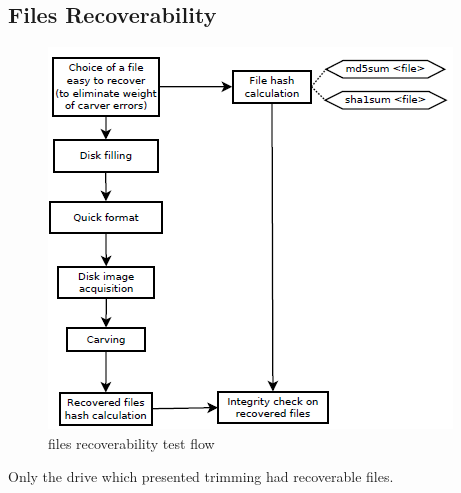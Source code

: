     \subsection{Files Recoverability}
        \begin{figure}[ht!]
            \centering
            \includegraphics[width=0.5\linewidth]{recoverability.png}
            \caption{files recoverability test flow}
        \end{figure}
        Only the drive which presented trimming had recoverable files.